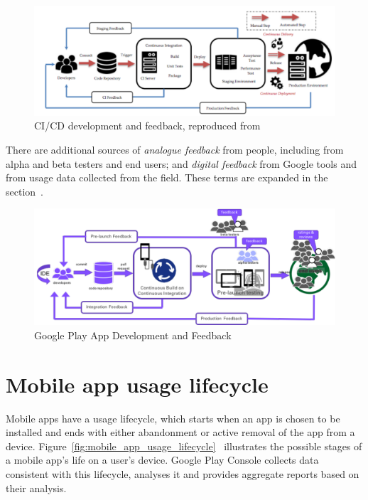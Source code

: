 \begin{figure}
    \includegraphics[width=\linewidth]{images/ci-cd-development-and-feedback.pdf}
    \caption{CI/CD development and feedback, reproduced from~\cite{shahin2019empirical_study_architecting_cd}}
    \label{fig:ci-cd-development-and-feedback}
\end{figure}

There are additional sources of \emph{analogue feedback} from people, including from alpha and beta testers and end users; and \emph{digital feedback} from Google tools and from usage data collected from the field. These terms are expanded in the section~\href{analogue-and-digital-feedback}{\emph{}}.

\begin{figure}
    \includegraphics[width=\linewidth]{images/google-play-app-development.pdf}
    \caption{Google Play App Development and Feedback}
    \label{fig:google-play-app-development-and-feedback}
\end{figure}


\section{Mobile app usage lifecycle}
Mobile apps have a usage lifecycle, which starts when an app is chosen to be installed and ends with either abandonment or active removal of the app from a device. Figure~\ref{fig:mobile_app_usage_lifecycle}~ illustrates the possible stages of a mobile app's life on a user's device. Google Play Console collects data consistent with this lifecycle, analyses it and provides aggregate reports based on their analysis. 

